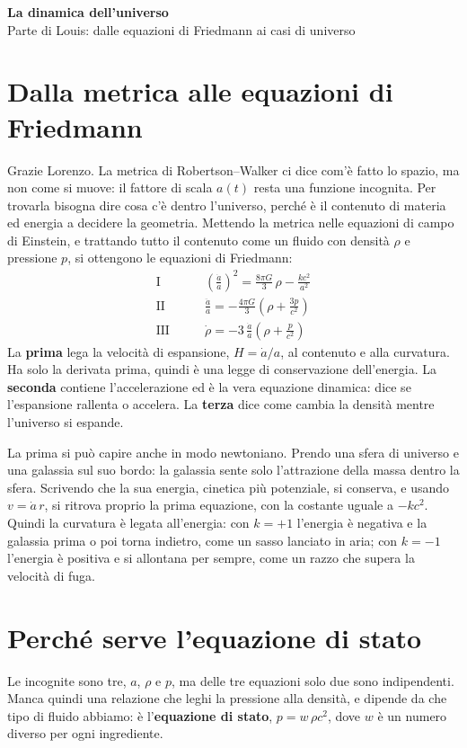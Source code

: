 \documentclass[12pt,a4paper]{article}
\begin{document}
\begin{center}
{\Large\bfseries La dinamica dell'universo}\\[3pt]
{\large Parte di Louis: dalle equazioni di Friedmann ai casi di universo}
\end{center}

\section{Dalla metrica alle equazioni di Friedmann}
Grazie Lorenzo. La metrica di Robertson--Walker ci dice com'è fatto lo spazio, ma non come si muove: il fattore di scala $a(t)$ resta una funzione incognita. Per trovarla bisogna dire cosa c'è dentro l'universo, perché è il contenuto di materia ed energia a decidere la geometria. Mettendo la metrica nelle equazioni di campo di Einstein, e trattando tutto il contenuto come un fluido con densità $\rho$ e pressione $p$, si ottengono le equazioni di Friedmann:
\begin{align*}
\text{I} \qquad & \left(\frac{\dot a}{a}\right)^2 = \frac{8\pi G}{3}\,\rho - \frac{k c^2}{a^2} \\[2pt]
\text{II} \qquad & \frac{\ddot a}{a} = -\frac{4\pi G}{3}\left(\rho + \frac{3p}{c^2}\right) \\[2pt]
\text{III} \qquad & \dot\rho = -3\,\frac{\dot a}{a}\left(\rho + \frac{p}{c^2}\right)
\end{align*}
La \textbf{prima} lega la velocità di espansione, $H = \dot a/a$, al contenuto e alla curvatura. Ha solo la derivata prima, quindi è una legge di conservazione dell'energia. La \textbf{seconda} contiene l'accelerazione ed è la vera equazione dinamica: dice se l'espansione rallenta o accelera. La \textbf{terza} dice come cambia la densità mentre l'universo si espande.

La prima si può capire anche in modo newtoniano. Prendo una sfera di universo e una galassia sul suo bordo: la galassia sente solo l'attrazione della massa dentro la sfera. Scrivendo che la sua energia, cinetica più potenziale, si conserva, e usando $v = \dot a\, r$, si ritrova proprio la prima equazione, con la costante uguale a $-kc^2$. Quindi la curvatura è legata all'energia: con $k = +1$ l'energia è negativa e la galassia prima o poi torna indietro, come un sasso lanciato in aria; con $k = -1$ l'energia è positiva e si allontana per sempre, come un razzo che supera la velocità di fuga.

\section{Perché serve l'equazione di stato}
Le incognite sono tre, $a$, $\rho$ e $p$, ma delle tre equazioni solo due sono indipendenti. Manca quindi una relazione che leghi la pressione alla densità, e dipende da che tipo di fluido abbiamo: è l'\textbf{equazione di stato}, $p = w\,\rho c^2$, dove $w$ è un numero diverso per ogni ingrediente.
\end{document}
